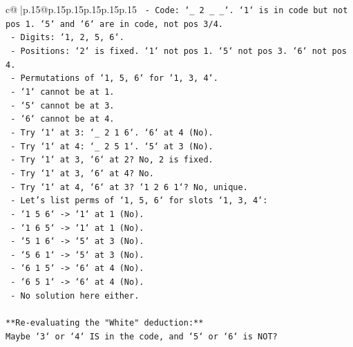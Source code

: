 \documentclass{article}
\begin{document}
{\begin{supertabular}{c@{$\;$}|p{.15\linewidth}@{}p{.15\linewidth}p{.15\linewidth}p{.15\linewidth}p{.15\linewidth}p{.15\linewidth}}
{{{\texttt{                            {-} Code: `\_ 2 \_ \_`. `1` is in code but not pos 1. `5` and `6` are in code, not pos 3/4.} \\
\texttt{                            {-} Digits: `1, 2, 5, 6`.} \\
\texttt{                            {-} Positions: `2` is fixed. `1` not pos 1. `5` not pos 3. `6` not pos 4.} \\
\texttt{                            {-} Permutations of `1, 5, 6` for `1, 3, 4`.} \\
\texttt{                            {-} `1` cannot be at 1.} \\
\texttt{                            {-} `5` cannot be at 3.} \\
\texttt{                            {-} `6` cannot be at 4.} \\
\texttt{                            {-} Try `1` at 3: `\_ 2 1 6`. `6` at 4 (No).} \\
\texttt{                            {-} Try `1` at 4: `\_ 2 5 1`. `5` at 3 (No).} \\
\texttt{                            {-} Try `1` at 3, `6` at 2? No, 2 is fixed.} \\
\texttt{                            {-} Try `1` at 3, `6` at 4? No.} \\
\texttt{                            {-} Try `1` at 4, `6` at 3? `1 2 6 1`? No, unique.} \\
\texttt{                            {-} Let's list perms of `1, 5, 6` for slots `1, 3, 4`:} \\
\texttt{                                {-} `1 5 6` {-}> `1` at 1 (No).} \\
\texttt{                                {-} `1 6 5` {-}> `1` at 1 (No).} \\
\texttt{                                {-} `5 1 6` {-}> `5` at 3 (No).} \\
\texttt{                                {-} `5 6 1` {-}> `5` at 3 (No).} \\
\texttt{                                {-} `6 1 5` {-}> `6` at 4 (No).} \\
\texttt{                                {-} `6 5 1` {-}> `6` at 4 (No).} \\
\texttt{                            {-} No solution here either.} \\
\\ 
\texttt{**Re{-}evaluating the "White" deduction:**} \\
\texttt{Maybe `3` or `4` IS in the code, and `5` or `6` is NOT?} \\
}}}
\end{supertabular}}
\end{document}
